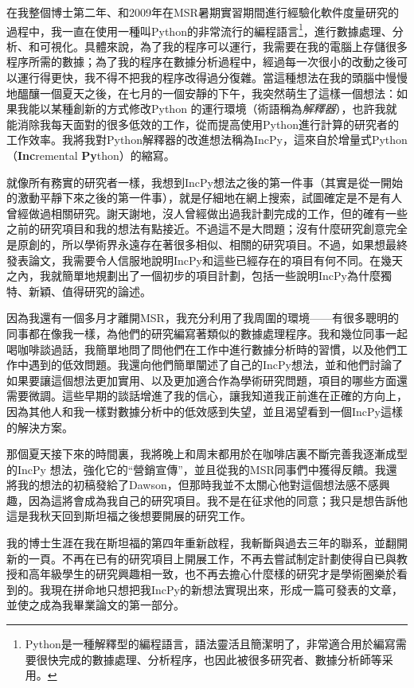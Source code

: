 \documentclass[12pt,UTF8,nofonts]{book}
\begin{document}
在我整個博士第二年、和2009年在MSR暑期實習期間進行經驗化軟件度量研究的過程中，我一直在使用一種叫Python的非常流行的編程語言\footnote{Python是一種解釋型的編程語言，語法靈活且簡潔明了，非常適合用於編寫需要很快完成的數據處理、分析程序，也因此被很多研究者、數據分析師等采用。}，進行數據處理、分析、和可視化。具體來說，為了我的程序可以運行，我需要在我的電腦上存儲很多程序所需的數據；為了我的程序在數據分析過程中，經過每一次很小的改動之後可以運行得更快，我不得不把我的程序改得過分復雜。當這種想法在我的頭腦中慢慢地醞釀一個夏天之後，在七月的一個安靜的下午，我突然萌生了這樣一個想法：如果我能以某種創新的方式修改Python 的運行環境（術語稱為\emph{解釋器}），也許我就能消除我每天面對的很多低效的工作，從而提高使用Python進行計算的研究者的工作效率。我將我對Python解釋器的改進想法稱為IncPy，這來自於增量式Python （\textbf{Inc}remental \textbf{Py}thon）的縮寫。

\breakline

就像所有務實的研究者一樣，我想到IncPy想法之後的第一件事（其實是從一開始的激動平靜下來之後的第一件事），就是仔細地在網上搜索，試圖確定是不是有人曾經做過相關研究。謝天謝地，沒人曾經做出過我計劃完成的工作，但的確有一些之前的研究項目和我的想法有點接近。不過這不是大問題；沒有什麼研究創意完全是原創的，所以學術界永遠存在著很多相似、相關的研究項目。不過，如果想最終發表論文，我需要令人信服地說明IncPy和這些已經存在的項目有何不同。在幾天之內，我就簡單地規劃出了一個初步的項目計劃，包括一些說明IncPy為什麼獨特、新穎、值得研究的論述。

因為我還有一個多月才離開MSR，我充分利用了我周圍的環境——有很多聰明的同事都在像我一樣，為他們的研究編寫著類似的數據處理程序。我和幾位同事一起喝咖啡談過話，我簡單地問了問他們在工作中進行數據分析時的習慣，以及他們工作中遇到的低效問題。我還向他們簡單闡述了自己的IncPy想法，並和他們討論了如果要讓這個想法更加實用、以及更加適合作為學術研究問題，項目的哪些方面還需要微調。這些早期的談話增進了我的信心，讓我知道我正前進在正確的方向上，因為其他人和我一樣對數據分析中的低效感到失望，並且渴望看到一個IncPy這樣的解決方案。

那個夏天接下來的時間裏，我將晚上和周末都用於在咖啡店裏不斷完善我逐漸成型的IncPy 想法，強化它的“營銷宣傳”，並且從我的MSR同事們中獲得反饋。我還將我的想法的初稿發給了Dawson，但那時我並不太關心他對這個想法感不感興趣，因為這將會成為我自己的研究項目。我不是在征求他的同意；我只是想告訴他這是我秋天回到斯坦福之後想要開展的研究工作。

\breakline

我的博士生涯在我在斯坦福的第四年重新啟程，我斬斷與過去三年的聯系，並翻開新的一頁。不再在已有的研究項目上開展工作，不再去嘗試制定計劃使得自已與教授和高年級學生的研究興趣相一致，也不再去擔心什麼樣的研究才是學術圈樂於看到的。我現在拼命地只想把我IncPy的新想法實現出來，形成一篇可發表的文章，並使之成為我畢業論文的第一部分。
\end{document}
